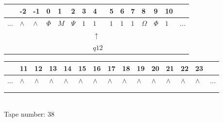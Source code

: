 \documentclass[11pt]{article}
\begin{document}
\begin{table}[H]
\centering
\begin{tabular}{lllllllllllllll}
 & -2 & -1 & 0 & 1 & 2 & 3 & 4 & 5 & 6 & 7 & 8 & 9 & 10 & \\
\hline
$...$ & \multicolumn{1}{|l|}{$\wedge$} & \multicolumn{1}{|l|}{$\wedge$} & \multicolumn{1}{|l|}{$\Phi$} & \multicolumn{1}{|l|}{$M$} & \multicolumn{1}{|l|}{$\Psi$} & \multicolumn{1}{|l|}{$1$} & \multicolumn{1}{|l|}{$1$} & \multicolumn{1}{|l|}{$1$} & \multicolumn{1}{|l|}{$1$} & \multicolumn{1}{|l|}{$1$} & \multicolumn{1}{|l|}{$\Omega$} & \multicolumn{1}{|l|}{$\Phi$} & \multicolumn{1}{|l|}{$1$} & $...$\\
\hline
&  &  &  &  &  &  & $\uparrow$ &  &  &  &  &  &  &  \\
&  &  &  &  &  &  & $ q12 $ &  &  &  &  &  &  &  \\
\end{tabular}
\begin{tabular}{lllllllllllllll}
 & 11 & 12 & 13 & 14 & 15 & 16 & 17 & 18 & 19 & 20 & 21 & 22 & 23 & \\
\hline
$...$ & \multicolumn{1}{|l|}{$\wedge$} & \multicolumn{1}{|l|}{$\wedge$} & \multicolumn{1}{|l|}{$\wedge$} & \multicolumn{1}{|l|}{$\wedge$} & \multicolumn{1}{|l|}{$\wedge$} & \multicolumn{1}{|l|}{$\wedge$} & \multicolumn{1}{|l|}{$\wedge$} & \multicolumn{1}{|l|}{$\wedge$} & \multicolumn{1}{|l|}{$\wedge$} & \multicolumn{1}{|l|}{$\wedge$} & \multicolumn{1}{|l|}{$\wedge$} & \multicolumn{1}{|l|}{$\wedge$} & \multicolumn{1}{|l|}{$\wedge$} & $...$\\
\hline
&  &  &  &  &  &  &  &  &  &  &  &  &  &  \\
&  &  &  &  &  &  &  &  &  &  &  &  &  &  \\
\end{tabular}
\\
Tape number: 38
\noindent\makebox[\linewidth]{\hdashrule{\textwidth}{1pt}{1pt}}\end{table}
\end{document}
